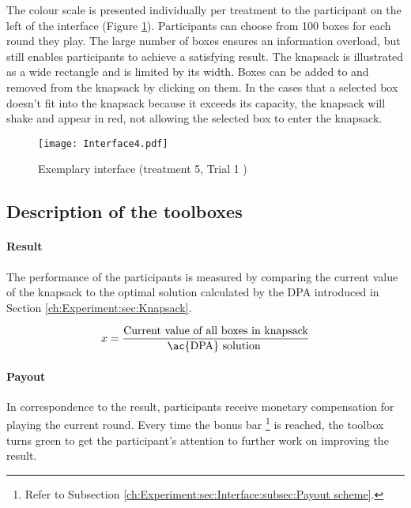The colour scale is presented individually per treatment to the participant on the left of the interface (Figure \ref{fig:Interface}).
Participants can choose from 100 boxes for each round they play. The large number of boxes ensures an information overload, but still enables participants to achieve a satisfying result.
The knapsack is illustrated as a wide rectangle and is limited by its width. Boxes can be added to and removed from the knapsack by clicking on them. In the cases that a selected box doesn't fit into the knapsack because it exceeds its capacity, the knapsack will shake and appear in red, not allowing the selected box to enter the knapsack. 
 \begin{figure}[htp] %
\begin{center} %
  \texttt{[image: Interface4.pdf]}
\caption{Exemplary interface (treatment 5, Trial 1 )}
\end{center}
\label{fig:Interface}
\end{figure} 
\subsection{Description of the toolboxes}

\paragraph{Result}

The performance of the participants is measured by comparing the current value of the knapsack to the optimal solution calculated by the \ac{DPA} introduced in Section \ref{ch:Experiment:sec:Knapsack}.
  
\begin{equation}
x = \dfrac{\text{Current value of all boxes in knapsack}}{\text{\ac{DPA} solution }}
\label{eq:x}
\end{equation}

\paragraph{Payout}

In correspondence to the result, participants receive monetary compensation for playing the current round. Every time the bonus bar \footnote{Refer to Subsection \ref{ch:Experiment:sec:Interface:subsec:Payout scheme}.} is reached, the toolbox turns green to get the participant's attention to further work on improving the result.

